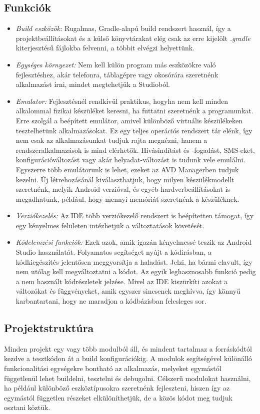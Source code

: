 \subsection{Funkciók}
\begin{itemize}
	\item \emph{Build eszközök:} Rugalmas, Gradle-alapú build rendszert használ, így a projektbeállításokat és a külső könyvtárakat elég csak az erre kijelölt \emph{.gradle} kiterjesztésű fájlokba felvenni, a többit elvégzi helyettünk.
	\item \emph{Egységes környezet:} Nem kell külön program más eszközökre való fejlesztéshez, akár telefonra, táblagépre vagy okosórára szeretnénk alkalmazást írni, mindet megtehetjük a Studioból.
	\item \emph{Emulator:} Fejlesztésnél rendkívül praktikus, hogyha nem kell minden alkalommal fizikai készüléket keresni, ha futtatni szeretnénk a programunkat. Erre szolgál a beépített emulátor, amivel különböző virtuális készülékeken tesztelhetünk alkalmazásokat. Ez egy teljes operációs rendszert tár elénk, így nem csak az alkalmazásunkat tudjuk rajta megnézni, hanem a rendszeralkalmazások is mind elérhetők. Hívásindítást és -fogadást, SMS-eket, konfigurációváltozást vagy akár helyadat-változást is tudunk vele emulálni. Egyszerre több emulátorunk is lehet, ezeket az AVD Managerben tudjuk kezelni. Új létrehozásánál kiválaszthatjuk, hogy milyen készülékmodellt szeretnénk, melyik Android verzióval, és egyéb hardverbeállításokat is megadhatunk, például, hogy mennyi memóriát szeretnénk a készüléknek.
	\item \emph{Verziókezelés:} Az IDE több verziókezelő rendszert is beépítetten támogat, így egy kényelmes felületen intézhetjük a változtatások követését.
	\item \emph{Kódelemzési funkciók:} Ezek azok, amik igazán kényelmessé teszik az Android Studio használatát. Folyamatos segítséget nyújt a kódírásban, a kódkiegészítés jelentősen meggyorsítja a haladást. Jelzi, ha bármi elavult, így nem utólag kell megváltoztatni a kódot. Az egyik leghasznosabb funkció pedig a nem használt kódrészletek jelzése. Mivel az IDE kiszürkíti azokat a változókat és függvényeket, amik egyszer sincsenek meghívva, így könnyű karbantartani, hogy ne maradjon a kódbázisban felesleges sor.
\end{itemize}

\subsection{Projektstruktúra}
Minden projekt egy vagy több modulból áll, és mindent tartalmaz a forráskódtól kezdve a tesztkódon át a build konfigurációkig. A modulok segítségével különálló funkcionalitási egységekre bontható az alkalmazás, melyeket egymástól függetlenül lehet buildelni, tesztelni és debugolni. \cite{ProjectStructure}
Célszerű modulokat használni, ha például különböző eszköztípusokra szeretnénk fejleszteni, hiszen így az egymástól független részeket elkülöníthetjük, de a közös kódot meg tudjuk osztani köztük.


